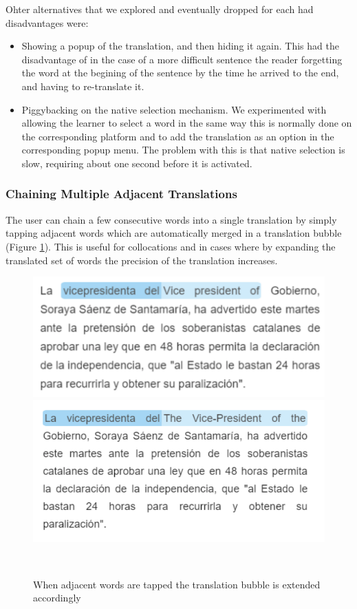 Ohter alternatives that we explored and eventually dropped for each had disadvantages were: 
\begin{itemize}

  \item Showing a popup of the translation, and then hiding it again. This had the disadvantage of in the case of a more difficult sentence the reader forgetting the word at the begining of the sentence by the time he arrived to the end, and having to re-translate it. 

  \item Piggybacking on the native selection mechanism. We experimented with allowing the learner to select a word in the same way this is normally done on the corresponding platform and to add the translation as an option in the corresponding popup menu. The problem with this is that native selection is slow, requiring about one second before it is activated. 
\end{itemize}


\subsubsection{Chaining Multiple Adjacent Translations}
The user can chain a few consecutive words into a single translation by simply tapping adjacent words which are automatically merged in a translation bubble (Figure \ref{fig:translation_extension}). This is useful for collocations and in cases where by expanding the translated set of words the precision of the translation increases. 

    \begin{figure}[h!]
    \centering
      \includegraphics[width=0.8\columnwidth]{figures/translated_words1}
      \includegraphics[width=0.8\columnwidth]{figures/translated_words2}
      \caption{When adjacent words are tapped the translation bubble is extended accordingly}~\label{fig:translation_extension}
    \end{figure}

